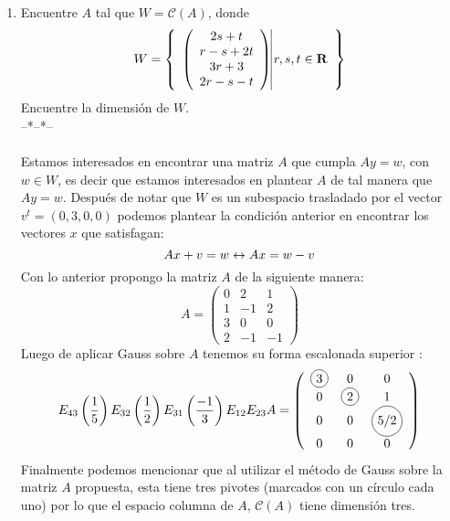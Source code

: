 \documentclass[letter]{memoir} %
\newcommand\Circle[1]{%
  \tikz[baseline=(char.base)]\node[circle,draw,inner sep=2pt] (char) {#1};}
\begin{document}
\begin{enumerate}
\item Encuentre $A$ tal que $W = \mathcal{C}(A)$, donde 
	\[
			W = \left\{ 
            \begin{array}{cc}
            \left(
            \begin{array}{c}
             2s+t \\
             r-s+2t\\
             3r+3\\
             2r-s-t\\
         
            \end{array}
            \right)
            \vline
            r,s,t \in \mathbf{R}{}
            \end{array}
					 \right\}
		\]
Encuentre la dimensión de $W$.\\
--*--*--\\\\
Estamos interesados en encontrar una matriz $A$ que cumpla $Ay = w$, con $w\in W$, es decir que estamos interesados en plantear $A$ de tal manera que $Ay = w$. Después de notar que $W$ es un subespacio trasladado por el vector $v^t = (0,3,0,0)$ podemos plantear la condición anterior en encontrar los vectores $x$ que satisfagan:
\begin{equation*}
Ax+v = w \\ 
\leftrightarrow \\
Ax = w-v 
\end{equation*}  
Con lo anterior propongo la matriz $A$ de la siguiente manera: \\
\[
			A= \left( 
            \begin{array}{ccc}
            0 & 2 & 1 \\
            1 & -1 & 2 \\
            3 & 0& 0 \\
            2 & -1 & -1
            \end{array}
					\right)
		\]
 Luego de aplicar Gauss sobre $A$ tenemos su forma escalonada superior : 
\[
E_{43}\left(\frac{1}{5}\right)E_{32}\left(\frac{1}{2}\right)E_{31}\left(\frac{-1}{3}\right)E_{12}E_{23}A = \left(\begin{array}{ccc}
					\Circle{3} & 0& 0 \\
                    0 &\Circle{2} & 1\\
                    0 & 0& \Circle{5/2} \\
                    0 & 0&0 
					\end{array} \right)
\]
Finalmente podemos mencionar que al utilizar el método de Gauss sobre la matriz $A$ propuesta, esta tiene tres pivotes (marcados con un círculo cada uno) por lo que el espacio columna de $A$, $\mathcal{C}(A)$ tiene dimensión tres. 


\end{enumerate}
\end{document}
